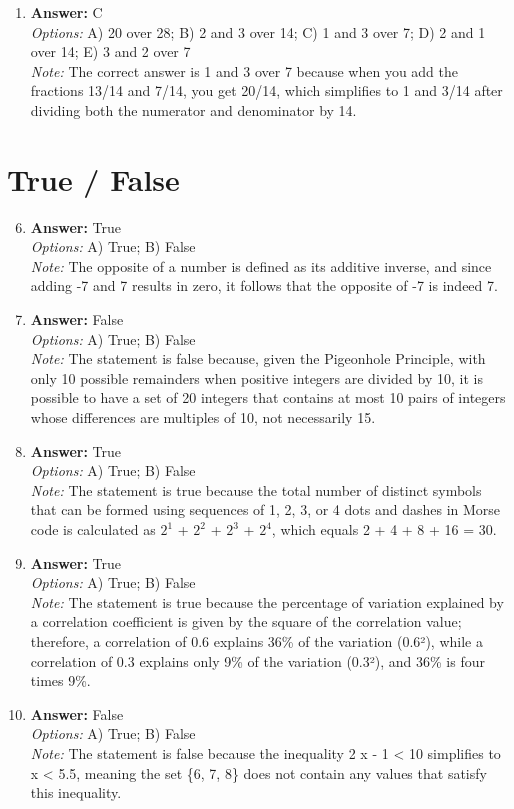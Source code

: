 \documentclass[12pt]{article}
\begin{document}
\begin{enumerate}[label=\arabic*.]
\item \textbf{Answer:} C
\\ \textit{Options:} A) 20 over 28; B) 2 and 3 over 14; C) 1 and 3 over 7; D) 2 and 1 over 14; E) 3 and 2 over 7
\\ \textit{Note:} The correct answer is 1 and 3 over 7 because when you add the fractions 13/14 and 7/14, you get 20/14, which simplifies to 1 and 3/14 after dividing both the numerator and denominator by 14.
\end{enumerate}

\section*{True / False}
\begin{enumerate}[label=\arabic*.]
\setcounter{enumi}{5}
\item \textbf{Answer:} True
\\ \textit{Options:} A) True; B) False
\\ \textit{Note:} The opposite of a number is defined as its additive inverse, and since adding -7 and 7 results in zero, it follows that the opposite of -7 is indeed 7.
\item \textbf{Answer:} False
\\ \textit{Options:} A) True; B) False
\\ \textit{Note:} The statement is false because, given the Pigeonhole Principle, with only 10 possible remainders when positive integers are divided by 10, it is possible to have a set of 20 integers that contains at most 10 pairs of integers whose differences are multiples of 10, not necessarily 15.
\item \textbf{Answer:} True
\\ \textit{Options:} A) True; B) False
\\ \textit{Note:} The statement is true because the total number of distinct symbols that can be formed using sequences of 1, 2, 3, or 4 dots and dashes in Morse code is calculated as $2^1$ + $2^2$ + $2^3$ + $2^4$, which equals 2 + 4 + 8 + 16 = 30.
\item \textbf{Answer:} True
\\ \textit{Options:} A) True; B) False
\\ \textit{Note:} The statement is true because the percentage of variation explained by a correlation coefficient is given by the square of the correlation value; therefore, a correlation of 0.6 explains 36\% of the variation (0.6²), while a correlation of 0.3 explains only 9\% of the variation (0.3²), and 36\% is four times 9\%.
\item \textbf{Answer:} False
\\ \textit{Options:} A) True; B) False
\\ \textit{Note:} The statement is false because the inequality 2 x - 1 \textless{} 10 simplifies to x \textless{} 5.5, meaning the set \{6, 7, 8\} does not contain any values that satisfy this inequality.
\end{enumerate}
\end{document}
